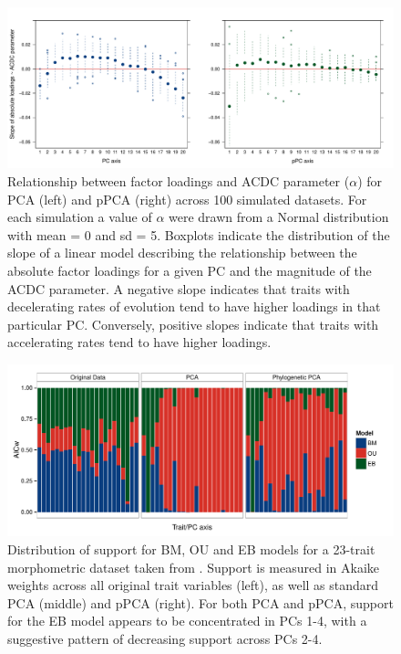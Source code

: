 \documentclass[a4paper,11pt]{article}
\begin{document}
\begin{figure}[p]
\centering
\includegraphics[scale=0.52]{./fig/acdc_slopes.pdf}
\caption{Relationship between factor loadings and ACDC parameter ($\alpha$) for PCA (left) and pPCA (right) across 100 simulated datasets. For each simulation a value of $\alpha$ were drawn from a Normal distribution with mean = 0 and sd = 5. Boxplots indicate the distribution of the slope of a linear model describing the relationship between the absolute factor loadings for a given PC and the magnitude of the ACDC parameter. A negative slope indicates that traits with decelerating rates of evolution tend to have higher loadings in that particular PC. Conversely, positive slopes indicate that traits with accelerating rates tend to have higher loadings.}
\label{ACDC}
\end{figure}

\begin{figure}[p]
\centering
\includegraphics[scale=0.65]{./fig/anoles_aicw.pdf}
\caption{Distribution of support for BM, OU and EB models for a 23-trait morphometric dataset taken from \cite{Mahler2010}. Support is measured in Akaike weights across all original trait variables (left), as well as standard PCA (middle) and pPCA (right). For both PCA and pPCA, support for the EB model appears to be concentrated in PCs 1-4, with a suggestive pattern of decreasing support across PCs 2-4. }
\label{anoles_aicw}
\end{figure}
\end{document}
